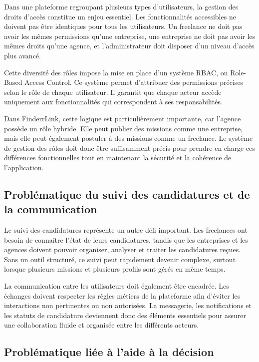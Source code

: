 Dans une plateforme regroupant plusieurs types d’utilisateurs, la gestion des droits d’accès constitue un enjeu essentiel. Les fonctionnalités accessibles ne doivent pas être identiques pour tous les utilisateurs. Un freelance ne doit pas avoir les mêmes permissions qu’une entreprise, une entreprise ne doit pas avoir les mêmes droits qu’une agence, et l’administrateur doit disposer d’un niveau d’accès plus avancé.

Cette diversité des rôles impose la mise en place d’un système RBAC, ou Role-Based Access Control. Ce système permet d’attribuer des permissions précises selon le rôle de chaque utilisateur. Il garantit que chaque acteur accède uniquement aux fonctionnalités qui correspondent à ses responsabilités.

Dans FinderrLink, cette logique est particulièrement importante, car l’agence possède un rôle hybride. Elle peut publier des missions comme une entreprise, mais elle peut également postuler à des missions comme un freelance. Le système de gestion des rôles doit donc être suffisamment précis pour prendre en charge ces différences fonctionnelles tout en maintenant la sécurité et la cohérence de l’application.

\subsection{Problématique du suivi des candidatures et de la communication}

Le suivi des candidatures représente un autre défi important. Les freelances ont besoin de connaître l’état de leurs candidatures, tandis que les entreprises et les agences doivent pouvoir organiser, analyser et traiter les candidatures reçues. Sans un outil structuré, ce suivi peut rapidement devenir complexe, surtout lorsque plusieurs missions et plusieurs profils sont gérés en même temps.

La communication entre les utilisateurs doit également être encadrée. Les échanges doivent respecter les règles métiers de la plateforme afin d’éviter les interactions non pertinentes ou non autorisées. La messagerie, les notifications et les statuts de candidature deviennent donc des éléments essentiels pour assurer une collaboration fluide et organisée entre les différents acteurs.

\subsection{Problématique liée à l’aide à la décision}

